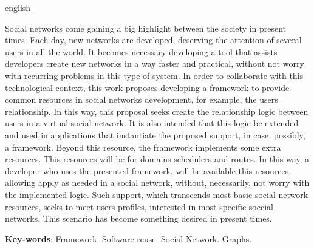 \begin{resumo}[Abstract]
 \begin{otherlanguage*}{english}
   
   Social networks come gaining a big highlight between the society in present times. Each day, new networks are developed, deserving the attention of several users in all the world. It becomes necessary developing a tool that assists developers create new networks in a way faster and practical, without not worry with recurring problems in this type of system. In order to collaborate with this technological context, this work proposes developing a framework to provide common resources in social networks development, for example, the users relationship. In this way, this proposal seeks create the relationship logic between users in a virtual social network. It is also intended that this logic be extended and used in applications that instantiate the proposed support, in case, possibly, a framework. Beyond this resource, the framework implements some extra resources. This resources will be for domains schedulers and routes. In this way, a developer who uses the presented framework, will be available this resources, allowing apply as needed in a social network, without, necessarily, not worry with the implemented logic. Such support, which transcends most basic social network resources, seeks to meet users profiles, interested in most specific soccial networks. This scenario has become something desired in present times.

   \vspace{\onelineskip}
 
   \noindent 
   \textbf{Key-words}: Framework. Software reuse. Social Network. Graphs.
 \end{otherlanguage*}
\end{resumo}
